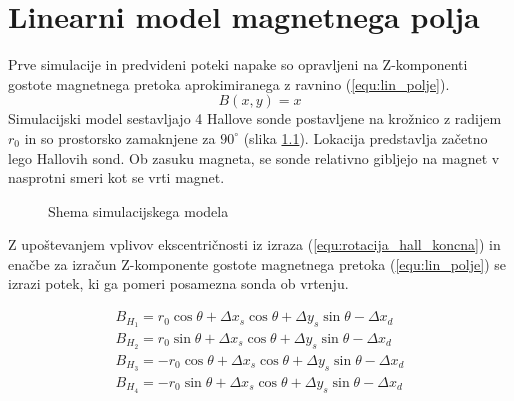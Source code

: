 \chapter{Linearni model magnetnega polja}
\label{linearnimodel}
Prve simulacije in predvideni poteki napake so opravljeni na Z-komponenti gostote magnetnega pretoka aprokimiranega z ravnino (\ref{equ:lin_polje}).
\begin{equation}
\label{equ:lin_polje}
B(x,y)= x
\end{equation}
Simulacijski model sestavljajo 4 Hallove sonde postavljene na krožnico z radijem $r_0$ in so prostorsko zamaknjene za $90^\circ$ (slika \ref{lin_simul}). Lokacija predstavlja začetno lego Hallovih sond. 
Ob zasuku magneta, se sonde relativno gibljejo na magnet v nasprotni smeri kot se vrti magnet. 
\begin{figure}[!ht]
	\centering
	\caption{Shema simulacijskega modela}
	\label{lin_simul}
\end{figure}

Z upoštevanjem vplivov ekscentričnosti iz izraza (\ref{equ:rotacija_hall_koncna}) in enačbe za izračun Z-komponente gostote magnetnega pretoka (\ref{equ:lin_polje}) se izrazi potek, ki ga pomeri posamezna sonda ob vrtenju. 


\begin{eqnarray}
\label{equ:lin_potek_sin}
B_{H_1}=  r_0 \cos \theta + \Delta x_s \cos \theta+ \Delta y_s \sin \theta -\Delta x_d\\
\label{equ:lin_potek_cos}
B_{H_2}= r_0 \sin \theta + \Delta x_s \cos \theta+ \Delta y_s \sin \theta -\Delta x_d\\
B_{H_3}=  -r_0 \cos \theta + \Delta x_s \cos \theta+ \Delta y_s \sin \theta -\Delta x_d\\
\label{equ:lin_potek_zadnja}
B_{H_4}=-r_0 \sin \theta + \Delta x_s \cos \theta+ \Delta y_s \sin \theta -\Delta x_d
\end{eqnarray}

